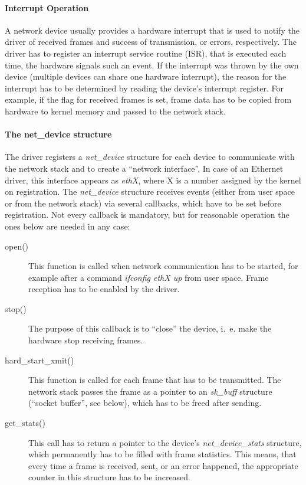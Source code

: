 \documentclass[a4paper,12pt,BCOR6mm,bibtotoc,idxtotoc]{scrbook}
\begin{document}
\paragraph{Interrupt Operation}

A network device usually provides a hardware interrupt that is used to
notify the driver of received frames and success of transmission, or
errors, respectively. The driver has to register an interrupt service
routine (ISR),
that is executed each time, the hardware signals such an event. If the
interrupt was thrown by the own device (multiple devices can share one
hardware interrupt), the reason for the interrupt has to be determined
by reading the device's interrupt register. For example, if the flag
for received frames is set, frame data has to be copied from hardware
to kernel memory and passed to the network stack.

\paragraph{The net\_device structure}

The driver registers a \textit{net\_device} structure for each device
to communicate with the network stack and to create a ``network
interface''. In case of an Ethernet driver, this interface appears as
\textit{ethX}, where X is a number assigned by the kernel on
registration. The \textit{net\_device} structure receives events
(either from user space or from the network stack) via several
callbacks, which have to be set before registration. Not every
callback is mandatory, but for reasonable operation the ones below are
needed in any case:

\begin{description}

\item[open()] This function is called when network communication has to be
started, for example after a command \textit{ifconfig ethX up} from user
space. Frame reception has to be enabled by the driver.

\item[stop()] The purpose of this callback is to ``close'' the device, i.~e.
make the hardware stop receiving frames.

\item[hard\_start\_xmit()] This function is cal\-led for each frame that has
to be transmitted. The network stack passes the frame as a pointer to an
\textit{sk\_buff} structure (``socket buffer'', see
below), which has to be freed after sending.

\item[get\_stats()] This call has to return a pointer to the device's
\textit{net\_device\_stats} structure, which permanently has to be filled with
frame statistics. This means, that every time a frame is received, sent, or an
error happened, the appropriate counter in this structure has to be increased.

\end{description}
\end{document}
